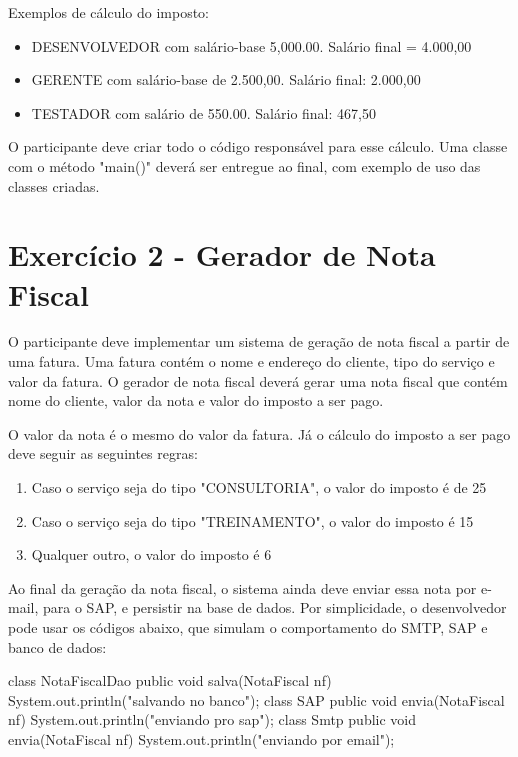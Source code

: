 Exemplos de cálculo do imposto:

\begin{itemize}
	\item DESENVOLVEDOR com salário-base 5,000.00. Salário final = 4.000,00
	\item GERENTE com salário-base de 2.500,00. Salário final: 2.000,00
	\item TESTADOR com salário de 550.00. Salário final: 467,50
\end{itemize}


O participante deve criar todo o código responsável para esse cálculo. Uma classe com
o método "main()" deverá ser entregue ao final, com exemplo de uso das classes criadas.

\section{Exercício 2 - Gerador de Nota Fiscal}

O participante deve implementar um sistema de geração de nota fiscal a partir de uma fatura. 
Uma fatura contém o nome e endereço do cliente, tipo do serviço e valor da fatura. O gerador de
nota fiscal deverá gerar uma nota fiscal que contém nome do cliente, valor da nota e valor
do imposto a ser pago.

O valor da nota é o mesmo do valor da fatura. Já o cálculo do imposto a ser pago deve seguir
as seguintes regras:

\begin{enumerate}
	\item Caso o serviço seja do tipo "CONSULTORIA", o valor do imposto é de 25%
	\item Caso o serviço seja do tipo "TREINAMENTO", o valor do imposto é 15%
	\item Qualquer outro, o valor do imposto é 6%
\end{enumerate}

Ao final da geração da nota fiscal, o sistema ainda deve enviar essa nota por e-mail,
para o SAP, e persistir na base de dados. Por simplicidade, o desenvolvedor pode usar
os códigos abaixo, que simulam o comportamento do SMTP, SAP e banco de dados:

class NotaFiscalDao {
	public void salva(NotaFiscal nf) { System.out.println("salvando no banco"); }
}
class SAP {
	public void envia(NotaFiscal nf) { System.out.println("enviando pro sap"); }
}
class Smtp {
	public void envia(NotaFiscal nf) { System.out.println("enviando por email"); }
}

